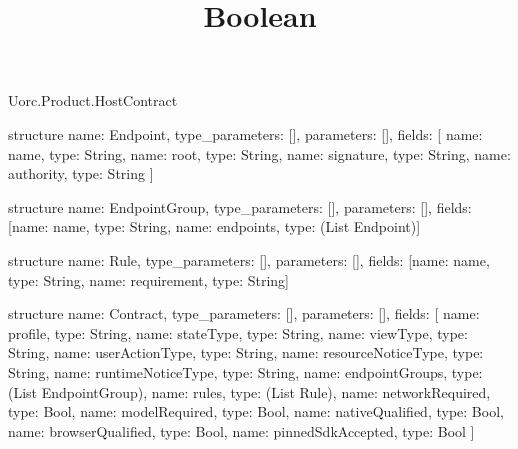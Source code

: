 \begin{lexlean}{Uorc.Product.HostContract}
\title{Boolean}
\begin{semanticmodule}
structure{
  name: Endpoint,
  type_parameters: [],
  parameters: [],
  fields: [
    {name: name, type: String},
    {name: root, type: String},
    {name: signature, type: String},
    {name: authority, type: String}
  ]
}

structure{
  name: EndpointGroup,
  type_parameters: [],
  parameters: [],
  fields: [{name: name, type: String}, {name: endpoints, type: (List Endpoint)}]
}

structure{
  name: Rule,
  type_parameters: [],
  parameters: [],
  fields: [{name: name, type: String}, {name: requirement, type: String}]
}

structure{
  name: Contract,
  type_parameters: [],
  parameters: [],
  fields: [
    {name: profile, type: String},
    {name: stateType, type: String},
    {name: viewType, type: String},
    {name: userActionType, type: String},
    {name: resourceNoticeType, type: String},
    {name: runtimeNoticeType, type: String},
    {name: endpointGroups, type: (List EndpointGroup)},
    {name: rules, type: (List Rule)},
    {name: networkRequired, type: Bool},
    {name: modelRequired, type: Bool},
    {name: nativeQualified, type: Bool},
    {name: browserQualified, type: Bool},
    {name: pinnedSdkAccepted, type: Bool}
  ]
}


\end{semanticmodule}
\end{lexlean}
